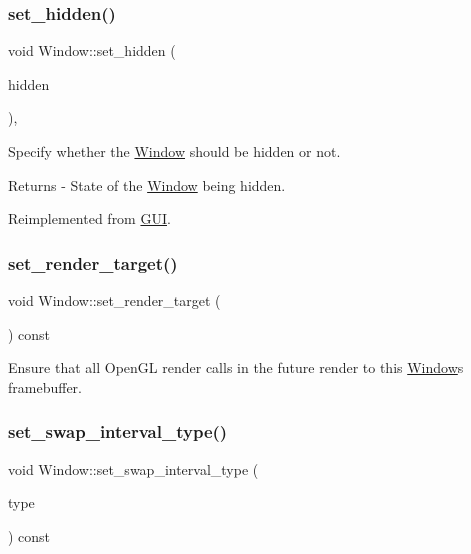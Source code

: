 \subsubsection{\texorpdfstring{set\+\_\+hidden()}{set\_hidden()}}
{\footnotesize\ttfamily void Window\+::set\+\_\+hidden (\begin{DoxyParamCaption}\item[{bool}]{hidden }\end{DoxyParamCaption})\hspace{0.3cm}{\ttfamily [override]}, {\ttfamily [virtual]}}

Specify whether the \mbox{\hyperlink{class_window}{Window}} should be hidden or not. \begin{DoxyReturn}{Returns}
-\/ State of the \mbox{\hyperlink{class_window}{Window}} being hidden. 
\end{DoxyReturn}


Reimplemented from \mbox{\hyperlink{class_g_u_i_a6400061907f3bba6fa465238e4d94ed1}{G\+UI}}.

\mbox{\label{class_window_a4d69ff4818898cd74241214183f404f9}} 
\subsubsection{\texorpdfstring{set\+\_\+render\+\_\+target()}{set\_render\_target()}}
{\footnotesize\ttfamily void Window\+::set\+\_\+render\+\_\+target (\begin{DoxyParamCaption}{ }\end{DoxyParamCaption}) const}

Ensure that all Open\+GL render calls in the future render to this \mbox{\hyperlink{class_window}{Window}}\textquotesingle{}s framebuffer. \mbox{\label{class_window_a86607cca316a63361a8e0546d7461496}} 
\subsubsection{\texorpdfstring{set\+\_\+swap\+\_\+interval\+\_\+type()}{set\_swap\_interval\_type()}}
{\footnotesize\ttfamily void Window\+::set\+\_\+swap\+\_\+interval\+\_\+type (\begin{DoxyParamCaption}\item[{Window\+::\+Swap\+Interval\+Type}]{type }\end{DoxyParamCaption}) const}

